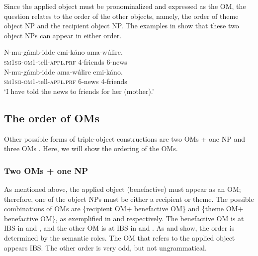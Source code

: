 \documentclass[output=paper,
            colorlinks, citecolor=brown
            ,draftmode
		  ]{langscibook}
\begin{document}
    Since the applied object must be pronominalized and expressed as the OM, the question relates to the order of the other objects, namely, the order of theme object NP and the recipient object NP. The examples in  show that these two object NPs can appear in either order. 

\ea%
    \label{ex:yoneda:44}
    \ea\label{ex:yoneda:44a}\gll N-mu-gámb-idde              emi-káno   ama-wúlire.\\
         \textsc{sm1sg-om1}-tell-\textsc{appl.prf}    4-friends    6-news \\
    \ex\label{ex:yoneda:44b}\gll N-mu-gámb-idde                 ama-wúlire   emi-káno.\\
    \textsc{sm1sg-om1}-tell-\textsc{appl.prf}  6-news       4-friends \\
    \glt ‘I have told the news to friends for her (mother).’
    \z
\z


\subsection{The order of OMs} 
\label{sec:yoneda:4.2}


Other possible forms of triple-object constructions are two OMs + one NP  and three OMs . Here, we will show the ordering of the OMs.


\subsubsection{Two OMs + one NP}
\label{sec:yoneda:4.2.1}
As mentioned above, the applied object (benefactive) must appear as an OM; therefore, one of the object NPs must be either a recipient or theme. The possible combinations of OMs are \{recipient OM+ benefactive OM\} and \{theme OM+ benefactive OM\}, as exemplified in  and  respectively. The benefactive OM is at IBS in  and , and the other OM is at IBS in  and . As  and  show, the order is determined by the semantic roles. The OM that refers to the applied object appears IBS. The other order is very odd, but not ungrammatical. 

\ea%
    \label{ex:yoneda:45}
    \z
\z
                 
\end{document}

